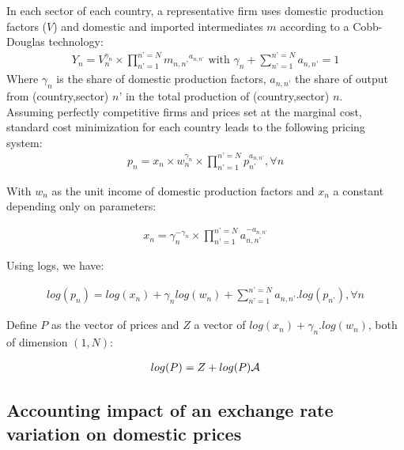 \documentclass[11pt,a4paper]{paper} %
\begin{document}
In each sector of each country, a representative firm uses domestic production factors ($V$) and domestic and imported intermediates $m$ according to a Cobb-Douglas technology:
\begin{eqnarray*}
Y_n=V^{\gamma_n}_n \times \prod_{n’=1}^{n’=N} {m_{n,n’}}^{a_{n,n’}} \text{ with } \gamma_n +\sum_{n’=1}^{n’=N} {a_{n,n’}} =1
\end{eqnarray*}
Where $\gamma_n$ is the share of domestic production factors, $a_{n,n’}$ the share of output from (country,sector) $n’$ in the total production of (country,sector) $n$. \\ 
Assuming perfectly competitive firms and prices set at the marginal cost, standard cost minimization for each country leads to the following pricing system:
\begin{eqnarray*}
	p_n=x_n \times w_n^{\gamma_n} \times \prod_{n’=1}^{n’=N}p_{n’}^{a_{n,n’}}, \forall n 
\end{eqnarray*}

With $w_n$ as the unit income of domestic production factors and $x_n$ a constant depending only on parameters:

\begin{eqnarray*}
	x_n=\gamma_n^{-\gamma_n} \times \prod_{n’=1}^{n’=N}a_{n,n’}^{-a_{n,n’}}
\end{eqnarray*}

Using logs, we have:

\begin{eqnarray*}
	log(p_n) = log(x_n) + \gamma_n log(w_n) + \sum_{n’=1}^{n’=N}a_{n,n’}.log(p_{n’}), \forall n
\end{eqnarray*}

Define $P$ as the vector of prices and $Z$ a vector of $log(x_n)+\gamma_n.log(w_n)$, both of dimension $(1,N)$: 

\begin{eqnarray}
	log(P)=Z + log(P){\cal A}
	\label{eq:priceequation} 
\end{eqnarray}




\subsection{Accounting impact of an exchange rate variation on domestic prices} \label{subsec:chocchange}
\end{document}
